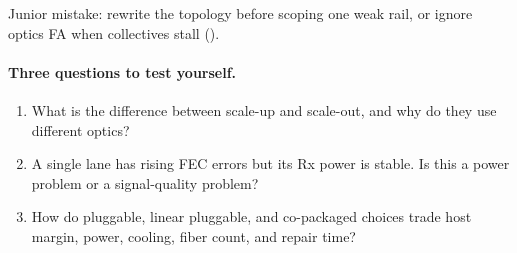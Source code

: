 Junior mistake: rewrite the topology before scoping one weak rail, or ignore
optics FA when collectives stall
().

\paragraph{Three questions to test yourself.}
\begin{enumerate}
\item What is the difference between scale-up and scale-out, and why do they use
      different optics?
\item A single lane has rising FEC errors but its Rx power is stable. Is this a
      power problem or a signal-quality problem?
\item How do pluggable, linear pluggable, and co-packaged choices trade host margin,
      power, cooling, fiber count, and repair time?
\end{enumerate}

